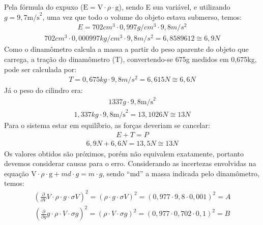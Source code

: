 Pela fórmula do expuxo (\(\mbox{E} = \mbox{V} \cdot \rho \cdot \mbox{g}\)), sendo E sua variável, e utilizando \(g = 9,7\mbox{m/s}^2\), uma vez que todo o volume do objeto estava submerso, temos:
\begin{align*}
    E = 702cm^3 \cdot 0,997g/cm^3 \cdot 9,8m/s^2
\end{align*}
\begin{align*}
 702cm^3 \cdot 0,000997kg/cm^3 \cdot 9,8m/s^2= 6,8589612 \cong 6,9 N
\end{align*}
Como o dinamômetro calcula a massa a partir do peso aparente do objeto que carrega, a tração do dinamômetro (T), convertendo-se 675g medidos em 0,675kg, pode ser calculada por:
\begin{align*}
    T = 0,675kg \cdot 9,8 m/s^2 = 6,615N \cong 6,6 N
\end{align*}
Já o peso do cilindro era:
\begin{align*}
    1337g \cdot 9,8 \mbox{m/s}^2
\end{align*}
\begin{align*}
    1,337kg \cdot 9,8 \mbox{m/s}^2 = 13,1026N \cong 13 N
\end{align*}
Para o sistema estar em equilíbrio, as forças deveriam se cancelar:
\begin{align*}
    E + T = P
\end{align*}
\begin{align*}
    6,9N + 6,6N = 13,5N \cong  13N 
\end{align*}
    Os valores obtidos são próximos, porém não equivalem exatamente, portanto devemos considerar causas para o erro. Considerando as incertezas envolvidas na equação \( \mbox{V} \cdot \rho \cdot \mbox{g} +md \cdot g = m \cdot g\), sendo ``md'' a massa indicada pelo dinamômetro, temos:
\begin{align*}
\left( \frac{\partial }{\partial V} V \cdot \rho \cdot g \cdot \sigma V \right)^{2} = \left( \rho \cdot g \cdot \sigma V \right)^{2} =  \left( 0,977 \cdot 9,8 \cdot 0,001 \right)^{2} =A
\end{align*}
\begin{align*}
\left( \frac{\partial }{\partial g} g \cdot \rho \cdot V \cdot \sigma g \right)^{2} =  \left( \rho \cdot V \cdot \sigma g \right)^{2} = \left( 0,977 \cdot 0,702 \cdot 0,1 \right)^{2} =B
\end{align*}
